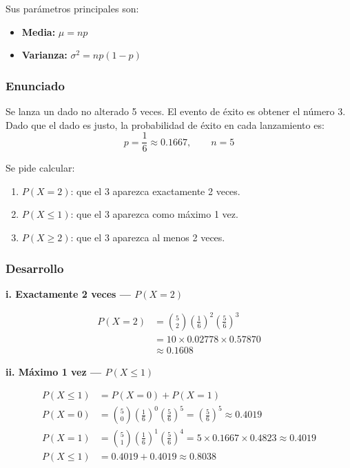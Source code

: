 \documentclass[12pt,a4paper]{article}
\begin{document}
Sus parámetros principales son:
\begin{itemize}
    \item \textbf{Media:} $\mu = np$
    \item \textbf{Varianza:} $\sigma^2 = np(1-p)$
\end{itemize}
 
\subsubsection*{Enunciado}
 
Se lanza un dado no alterado 5 veces. El evento de éxito es obtener el número 3.
Dado que el dado es justo, la probabilidad de éxito en cada lanzamiento es:
\[
    p = \frac{1}{6} \approx 0.1667, \qquad n = 5
\]
 
Se pide calcular:
\begin{enumerate}[label=\roman*.]
    \item $P(X = 2)$: que el 3 aparezca exactamente 2 veces.
    \item $P(X \leq 1)$: que el 3 aparezca como máximo 1 vez.
    \item $P(X \geq 2)$: que el 3 aparezca al menos 2 veces.
\end{enumerate}
 
\subsubsection*{Desarrollo}
 
\textbf{i. Exactamente 2 veces — $P(X = 2)$}
 
\begin{align}
    P(X = 2) &= \binom{5}{2} \left(\frac{1}{6}\right)^2 \left(\frac{5}{6}\right)^3 \\
             &= 10 \times 0.02778 \times 0.57870 \\
             &\approx \boxed{0.1608}
\end{align}
 
\textbf{ii. Máximo 1 vez — $P(X \leq 1)$}
 
\begin{align}
    P(X \leq 1) &= P(X=0) + P(X=1) \\[4pt]
    P(X = 0) &= \binom{5}{0} \left(\frac{1}{6}\right)^0 \left(\frac{5}{6}\right)^5
               = \left(\frac{5}{6}\right)^5 \approx 0.4019 \\[4pt]
    P(X = 1) &= \binom{5}{1} \left(\frac{1}{6}\right)^1 \left(\frac{5}{6}\right)^4
               = 5 \times 0.1667 \times 0.4823 \approx 0.4019 \\[4pt]
    P(X \leq 1) &= 0.4019 + 0.4019 \approx \boxed{0.8038}
\end{align}
 
\end{document}
